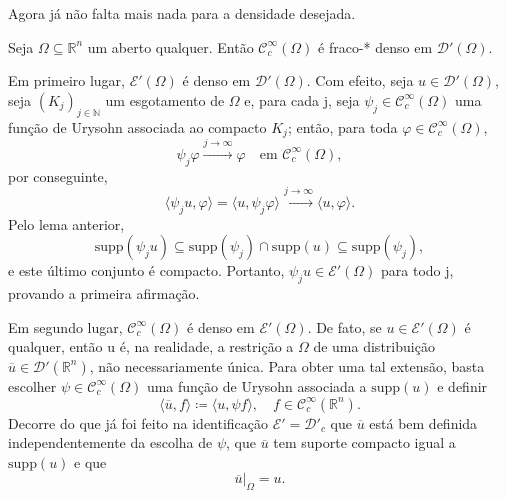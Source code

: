 \documentclass[../distribution_theory_notes.tex]{subfiles}
\begin{document}
Agora já não falta mais nada para a densidade desejada.
\begin{theorem*}
	Seja \(\Omega \subseteq \mathbb{R}^{n}\) um aberto qualquer. Então \(\mathcal{C}_{c}^{\infty}(\Omega )\) é fraco-* denso em \(\mathcal{D}'(\Omega )\).
\end{theorem*}
\begin{proof*}
	Em primeiro lugar, \(\mathcal{E}'(\Omega )\) é denso em \(\mathcal{D}'(\Omega )\). Com efeito, seja \(u\in \mathcal{D}'(\Omega )\), seja \((K_{j})_{j\in \mathbb{N}}\) um esgotamento de \(\Omega \) e, para cada j, seja \(\psi_{j}\in \mathcal{C}_{c}^{\infty}(\Omega )\) uma função de Urysohn associada ao compacto \(K_{j}\); então, para toda \(\varphi \in \mathcal{C}_{c}^{\infty}(\Omega )\),
	\[
		\psi_{j}\varphi \stackrel{j\to \infty}{\longrightarrow}\varphi
		\quad\text{em }\mathcal{C}_{c}^{\infty}(\Omega ),
	\]
	por conseguinte,
	\[
		\langle \psi_{j}u, \varphi  \rangle
		=\langle u, \psi_{j}\varphi  \rangle
		\stackrel{j\to \infty}{\longrightarrow}
		\langle u, \varphi  \rangle.
	\]
	Pelo lema anterior,
	\[
		\mathrm{supp}(\psi_{j}u)\subseteq \mathrm{supp}(\psi_{j})\cap \mathrm{supp}(u)\subseteq \mathrm{supp}(\psi_{j}),
	\]
	e este último conjunto é compacto. Portanto, \(\psi_{j}u\in \mathcal{E}'(\Omega )\) para todo j, provando a primeira afirmação.

	Em segundo lugar, \(\mathcal{C}_{c}^{\infty}(\Omega )\) é denso em \(\mathcal{E}'(\Omega )\). De fato, se \(u\in \mathcal{E}'(\Omega )\) é qualquer, então u é, na realidade, a restrição a \(\Omega \) de uma distribuição \(\overline{u}\in \mathcal{D}'(\mathbb{R}^{n})\), não necessariamente única. Para obter uma tal extensão, basta escolher \(\psi \in \mathcal{C}_{c}^{\infty}(\Omega )\) uma função de Urysohn associada a \(\mathrm{supp}(u)\) e definir
	\[
		\langle \overline{u}, f \rangle\coloneqq \langle u, \psi f \rangle,
		\quad f\in \mathcal{C}_{c}^{\infty}(\mathbb{R}^{n}).
	\]
	Decorre do que já foi feito na identificação \(\mathcal{E}'=\mathcal{D}'_{c}\) que \(\overline{u}\) está bem definida independentemente da escolha de \(\psi \), que \(\overline{u}\) tem suporte compacto igual a \(\mathrm{supp}(u)\) e que
	\[
		\overline{u}|_{\Omega }=u.
	\]


\end{proof*}
\end{document}
